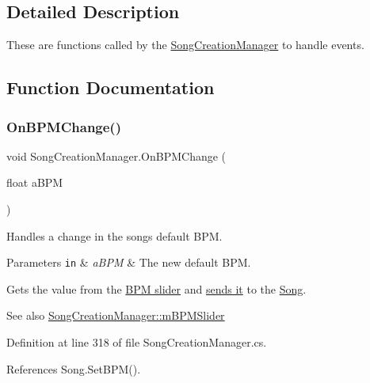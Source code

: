 \subsection{Detailed Description}
These are functions called by the \hyperlink{class_song_creation_manager}{Song\+Creation\+Manager} to handle events. 

\subsection{Function Documentation}
\mbox{\label{group___s_c_m_handlers_gae5930497314c77bd9c52c083b2f3e82e}} 
\subsubsection{\texorpdfstring{On\+B\+P\+M\+Change()}{OnBPMChange()}}
{\footnotesize\ttfamily void Song\+Creation\+Manager.\+On\+B\+P\+M\+Change (\begin{DoxyParamCaption}\item[{float}]{a\+B\+PM }\end{DoxyParamCaption})}



Handles a change in the song\textquotesingle{}s default B\+PM. 


\begin{DoxyParams}[1]{Parameters}
\mbox{\tt in}  & {\em a\+B\+PM} & The new default B\+PM.\\
\hline
\end{DoxyParams}
Gets the value from the \hyperlink{group___s_c_m_priv_var_ga87ac3691ad7848394e51442f29d9659d}{B\+PM slider} and \hyperlink{group___song_pub_func_gaa65bbba1af7192edff7e0f848029013b}{sends it} to the \hyperlink{group___s_c_m_priv_var_gabd8329149faef65a689650d951a9abc9}{Song}.

\begin{DoxySeeAlso}{See also}
\hyperlink{group___s_c_m_priv_var_ga87ac3691ad7848394e51442f29d9659d}{Song\+Creation\+Manager\+::m\+B\+P\+M\+Slider} 
\end{DoxySeeAlso}


Definition at line 318 of file Song\+Creation\+Manager.\+cs.



References Song.\+Set\+B\+P\+M().



